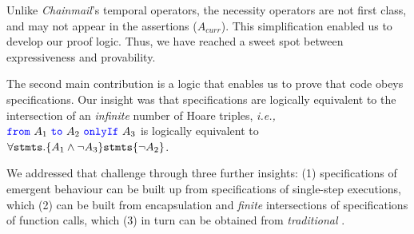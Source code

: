   
Unlike  \emph{Chainmail}'s temporal operators, 
 the necessity operators %
 are  not first class, and may not appear in the assertions  {(\eg  ${A_{curr}}$)}. 
 This simplification enabled us to develop our proof logic. 
 Thus, we {have reached} a  sweet spot between expressiveness and 
 provability.
 
 
 \vspace{.07in}
 The second main contribution is  a logic that  enables us to prove that code 
 obeys \Nec specifications. {}
{Our insight was  that \Nec specifications are logically equivalent to the
intersection of an \emph{infinite} number of Hoare triples, \emph{i.e.,} 
${\color{blue}\texttt{from}}\ A_1\ {\color{blue}\texttt{to}}\ A_2\ {\color{blue}\texttt{onlyIf}}\ A_3$ is 
logically equivalent
{to}
 $\forall {\texttt{stmts}}. \{ A_1 \wedge \neg A_3\} {\texttt{stmts}} \{ \neg A_2 \}$.
}


{We addressed that  challenge} through three further insights: 
 {(1) \Nec specifications of emergent behaviour can be built up from \Nec specifications of
 single-step executions, which (2) can be built from encapsulation and \emph{finite} intersections
 of \Nec specifications of function calls, which  
 (3) in turn can be obtained from \emph{traditional} \funcSpecs.}
 
